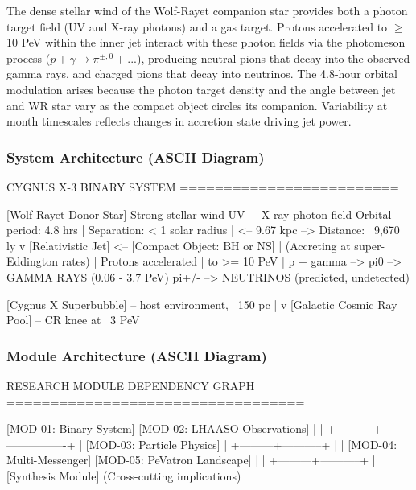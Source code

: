 \documentclass[11pt,letterpaper]{article}
\begin{document}
The dense stellar wind of the Wolf-Rayet companion star provides both a photon target field (UV and X-ray photons) and a gas target. Protons accelerated to $\geq$10 PeV within the inner jet interact with these photon fields via the photomeson process ($p + \gamma \rightarrow \pi^{\pm,0} + ...$), producing neutral pions that decay into the observed gamma rays, and charged pions that decay into neutrinos. The 4.8-hour orbital modulation arises because the photon target density and the angle between jet and WR star vary as the compact object circles its companion. Variability at month timescales reflects changes in accretion state driving jet power.

\subsubsection{System Architecture (ASCII Diagram)}

\begin{asciibox}
CYGNUS X-3 BINARY SYSTEM
=========================

     [Wolf-Rayet Donor Star]
      Strong stellar wind
      UV + X-ray photon field       Orbital period: 4.8 hrs
              |                     Separation: < 1 solar radius
              |  <-- 9.67 kpc -->   Distance: ~9,670 ly
              v
   [Relativistic Jet] <-- [Compact Object: BH or NS]
        |                  (Accreting at super-Eddington rates)
        | Protons accelerated
        | to >= 10 PeV
        |
    p + gamma --> pi0 --> GAMMA RAYS (0.06 - 3.7 PeV)
                  pi+/- --> NEUTRINOS (predicted, undetected)

   [Cygnus X Superbubble] -- host environment, ~150 pc
        |
        v
   [Galactic Cosmic Ray Pool] -- CR knee at ~3 PeV
\end{asciibox}

\subsubsection{Module Architecture (ASCII Diagram)}

\begin{asciibox}
RESEARCH MODULE DEPENDENCY GRAPH
==================================

  [MOD-01: Binary System]   [MOD-02: LHAASO Observations]
        |                           |
        +----------+----------------+
                   |
           [MOD-03: Particle Physics]
                   |
         +---------+-----------+
         |                     |
  [MOD-04: Multi-Messenger] [MOD-05: PeVatron Landscape]
         |                     |
         +---------+-----------+
                   |
           [Synthesis Module]
           (Cross-cutting implications)
\end{asciibox}
\end{document}
